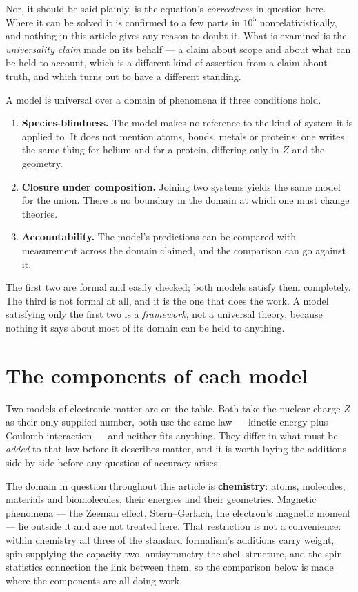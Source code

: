 \documentclass[11pt]{article}
\begin{document}
Nor, it should be said plainly, is the equation's \emph{correctness} in question here. Where it can
be solved it is confirmed to a few parts in $10^5$ nonrelativistically, and nothing in this article
gives any reason to doubt it. What is examined is the \emph{universality claim} made on its
behalf --- a claim about scope and about what can be held to account, which is a different kind of
assertion from a claim about truth, and which turns out to have a different standing.

A model is universal over a domain of phenomena if three conditions hold.

\begin{enumerate}
\item \textbf{Species-blindness.} The model makes no reference to the kind of system it is
applied to. It does not mention atoms, bonds, metals or proteins; one writes the same thing for
helium and for a protein, differing only in $Z$ and the geometry.
\item \textbf{Closure under composition.} Joining two systems yields the same model for the union.
There is no boundary in the domain at which one must change theories.
\item \textbf{Accountability.} The model's predictions can be compared with measurement across
the domain claimed, and the comparison can go against it.
\end{enumerate}

The first two are formal and easily checked; both models satisfy them completely. The third is
not formal at all, and it is the one that does the work. A model satisfying only the first two is
a \emph{framework}, not a universal theory, because nothing it says about most of its domain can
be held to anything.

\section{The components of each model}\label{sec:components}

Two models of electronic matter are on the table. Both take the nuclear charge $Z$ as their only
supplied number, both use the same law --- kinetic energy plus Coulomb interaction --- and neither
fits anything. They differ in what must be \emph{added} to that law before it describes matter,
and it is worth laying the additions side by side before any question of accuracy arises.

The domain in question throughout this article is \textbf{chemistry}: atoms, molecules, materials
and biomolecules, their energies and their geometries. Magnetic phenomena --- the Zeeman effect,
Stern--Gerlach, the electron's magnetic moment --- lie outside it and are not treated here. That
restriction is not a convenience: within chemistry all three of the standard formalism's additions
carry weight, spin supplying the capacity two, antisymmetry the shell structure, and the
spin--statistics connection the link between them, so the comparison below is made where the
components are all doing work.
\end{document}
